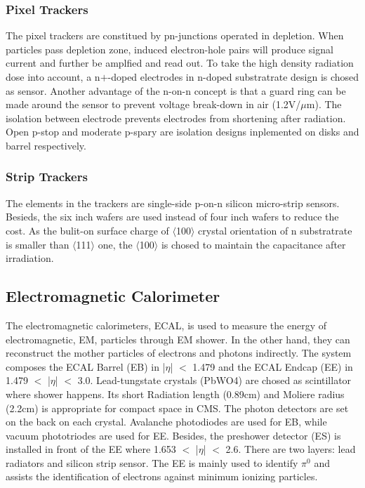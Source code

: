 \subsubsection{Pixel Trackers}
The pixel trackers are constitued by pn-junctions operated in depletion. 
When particles pass depletion zone, induced electron-hole pairs will produce signal current and further be amplfied and read out. 
To take the high density radiation dose into account, a n$+$-doped electrodes in n-doped substratrate design is chosed as sensor. 
Another advantage of the n-on-n concept is that a guard ring can be made around the sensor to prevent voltage break-down in air (1.2V/$\mu $m). 
The isolation between electrode prevents electrodes from shortening after radiation. Open p-stop and moderate p-spary are isolation designs inplemented on disks and barrel respectively.

\subsubsection{Strip Trackers}
The elements in the trackers are single-side p-on-n silicon micro-strip sensors. 
Besieds, the six inch wafers are used instead of four inch wafers to reduce the cost. 
As the bulit-on surface charge of $\langle$100$\rangle$ crystal orientation of n substratrate is smaller than $\langle$111$\rangle$ one, 
the $\langle$100$\rangle$ is chosed to maintain the capacitance after irradiation.

\subsection{Electromagnetic Calorimeter} 
The electromagnetic calorimeters, ECAL, is used to measure the energy of electromagnetic, EM, particles through EM shower. 
In the other hand, they can reconstruct the mother particles of electrons and photons indirectly.
The system composes the ECAL Barrel (EB) in |$\eta $| $<$ 1.479 and the ECAL Endcap (EE) in 1.479 $<$ |$\eta $| $<$ 3.0. 
Lead-tungstate crystals (PbWO4) are chosed as scintillator where shower happens.
Its short Radiation length (0.89cm) and Moliere radius (2.2cm) is appropriate for compact space in CMS.
The photon detectors are set on the back on each crystal. 
Avalanche photodiodes are used for EB, while vacuum phototriodes are used for EE. 
Besides, the preshower detector (ES) is installed in front of the EE where 1.653 $<$ |$\eta $| $<$ 2.6. 
There are two layers: lead radiators and silicon strip sensor.
The EE is mainly used to identify $\pi ^0$ and assists the identification of electrons against minimum ionizing particles.
 

